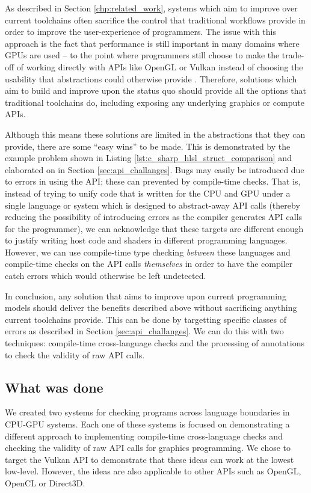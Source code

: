 \documentclass[a4paper,12pt,twoside,openright]{report}
\begin{document}
As described in Section \ref{chp:related_work}, systems which aim to improve
over current toolchains often sacrifice the control that traditional workflows
provide in order to improve the user-experience of programmers. The issue with
this approach is the fact that performance is still important in many domains
where GPUs are used -- to the point where programmers still choose to make the
trade-off of working directly with APIs like OpenGL or Vulkan instead of
choosing the usability that abstractions could otherwise provide \cite{TODO}.
Therefore, solutions which aim to build and improve upon the status quo should
provide all the options that traditional toolchains do, including exposing any
underlying graphics or compute APIs.

Although this means these solutions are limited in the abstractions that they
can provide, there are some ``easy wins'' to be made. This is demonstrated by
the example problem shown in Listing \ref{lst:c_sharp_hlsl_struct_comparison}
and elaborated on in Section \ref{sec:api_challanges}. Bugs may easily be
introduced due to errors in using the API; these can prevented by compile-time
checks. That is, instead of trying to unify code that is written for the CPU
and GPU under a single language or system which is designed to abstract-away
API calls (thereby reducing the possibility of introducing errors as the
compiler generates API calls for the programmer), we can acknowledge that these
targets are different enough to justify writing host code and shaders in
different programming languages. However, we can use compile-time type checking
\textit{between} these languages and compile-time checks on the API calls
\textit{themselves} in order to have the compiler catch errors which would
otherwise be left undetected.

In conclusion, any solution that aims to improve upon current programming
models should deliver the benefits described above without sacrificing anything
current toolchains provide. This can be done by targetting specific classes of
errors as described in Section \ref{sec:api_challanges}. We can do this with
two techniques: compile-time cross-language checks and the processing of
annotations to check the validity of raw API calls.

\subsection{What was done}

We created two systems for checking programs across language boundaries in
CPU-GPU systems. Each one of these systems is focused on demonstrating a
different approach to implementing compile-time cross-language checks and
checking the validity of raw API calls for graphics programming. We chose to
target the Vulkan API to demonstrate that these ideas can work at the lowest
low-level. However, the ideas are also applicable to other APIs such as OpenGL,
OpenCL or Direct3D.
\end{document}
